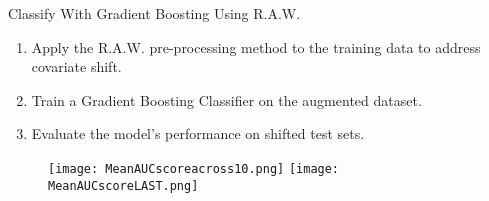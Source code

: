 \begin{frame}{Classify With Gradient Boosting Using R.A.W.}
    \begin{enumerate}
        \item  Apply the R.A.W. pre-processing method to the training data to address covariate shift.
        \item  Train a Gradient Boosting Classifier on the augmented dataset.
        \item  Evaluate the model's performance on shifted test sets.
    \end{enumerate}
    
    \vspace{1em}
    \begin{figure}
        \centering
        \texttt{[image: MeanAUCscoreacross10.png]}
        \hfill
        \texttt{[image: MeanAUCscoreLAST.png]}
    \end{figure}
    
\end{frame}



